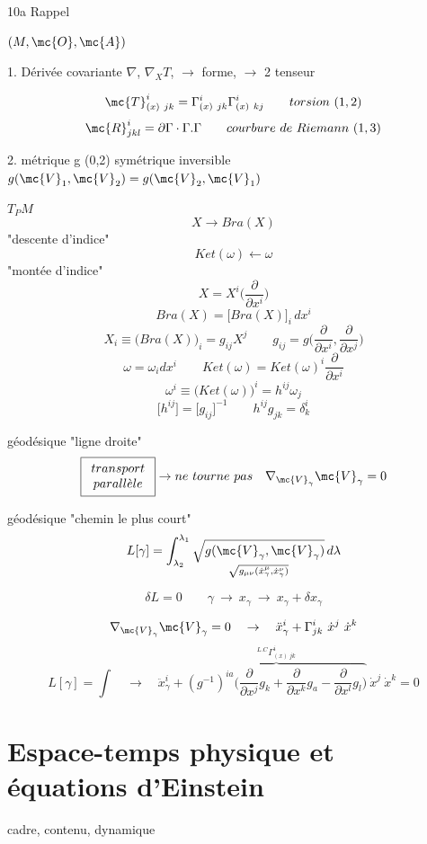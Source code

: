 10a Rappel

$(M, \mc{O}, \mc{A})$

1. Dérivée covariante $\nabla$, $\nabla_XT$, $\to$ forme, $\to$ 2 tenseur

\[
\mc{T}^i_{(x)\ jk} = \Gamma^i_{(x)\ jk} \Gamma^i_{(x)\ kj} \qquad torsion\ (1,2)
\]
\[
\mc{R}^i_{jkl} = \partial\Gamma \cdot \Gamma .\Gamma \qquad courbure\ de\ Riemann\ (1,3)
\]

2. métrique g (0,2) symétrique inversible $g(\mc{V}_1,\mc{V}_2)=g(\mc{V}_2,\mc{V}_1)$

$T_PM$
\[
X\to Bra(X)
\]
"descente d'indice"
\[
Ket(\omega)\leftarrow \omega
\]
"montée d'indice"
\[
X=X^i\big(\frac{\partial}{\partial x^i}\big)
\]
\[
Bra(X)=\big[Bra(X)\big]_i\,dx^i
\]
\[
X_i\equiv\big(Bra(X)\big)_i=g_{ij}X^j\qquad g_{ij}
=g\big(\frac{\partial}{\partial x^i},\frac{\partial}{\partial x^j}\big)
\]
\[
\omega=\omega_idx^i\qquad Ket(\omega)=Ket(\omega)^i\frac{\partial}{\partial x^i}
\]
\[
\omega^i\equiv\big(Ket(\omega)\big)^i=h^{ij}\omega_j
\]
\[
\big[h^{ij}\big]=\big[g_{ij}\big]^{-1}\qquad h^{ij}g_{jk}=\delta^i_k
\]

géodésique "ligne droite"
\[
\boxed{
\begin{array}{ c }
 transport \\ parall\grave{e}le \\
\end{array}} \to ne\ tourne\ pas \quad \nabla_{\mc{V}_\gamma}\mc{V}_\gamma=0
\]

géodésique "chemin le plus court"
\[
L[\gamma]=\int^{\lambda_1}_{\lambda_2}
\underset{ \sqrt{g_{\mu\nu}(\dot x^\mu_\gamma,\dot x^\nu_\gamma)}}
{\sqrt{g(\mc{V}_\gamma,\mc{V}_\gamma)}}\,d\lambda
\]

\[
\delta L=0 \qquad \gamma\ \to\ x_\gamma\ \to\ x_\gamma + \delta x_\gamma
\]

\[
\nabla_{\mc{V}_\gamma}\mc{V}_\gamma=0 \quad\to\quad
\ddot x^i_\gamma+\Gamma^i_{jk}\ \dot x^j\ \dot x^k
\]
\[
L[\gamma]=\int\quad\to\quad\ddot x^i_\gamma+\overbrace{(g^{-1})^{ia}\big(
\frac{\partial}{\partial x^j}g_{k}
+\frac{\partial}{\partial x^k}g_{a}
-\frac{\partial}{\partial x^l}g_{l}\big)
}^{\displaystyle ^{L.C}\Gamma^i_{(x)\ jk}}
\ \dot x^j\ \dot x^k =0
\]

\chapter{Espace-temps physique et équations d'Einstein}
cadre, contenu, dynamique


